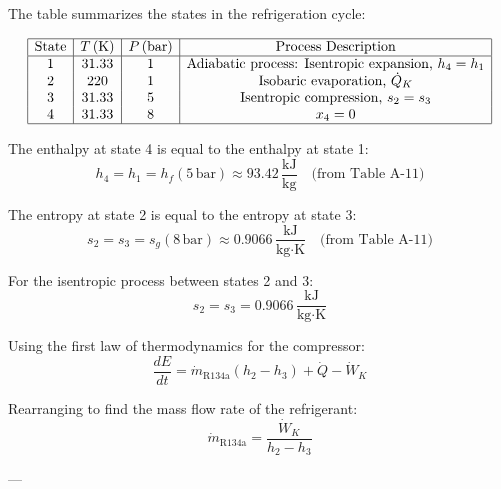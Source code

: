 The table summarizes the states in the refrigeration cycle:  

\[
\begin{array}{|c|c|c|c|}
\hline
\text{State} & T \, (\text{K}) & P \, (\text{bar}) & \text{Process Description} \\
\hline
1 & 31.33 & 1 & \text{Adiabatic process: Isentropic expansion, } h_4 = h_1 \\
2 & 220 & 1 & \text{Isobaric evaporation, } \dot{Q}_K \\
3 & 31.33 & 5 & \text{Isentropic compression, } s_2 = s_3 \\
4 & 31.33 & 8 & x_4 = 0 \\
\hline
\end{array}
\]

The enthalpy at state 4 is equal to the enthalpy at state 1:  
\[
h_4 = h_1 = h_f(5 \, \text{bar}) \approx 93.42 \, \frac{\text{kJ}}{\text{kg}} \quad \text{(from Table A-11)}  
\]

The entropy at state 2 is equal to the entropy at state 3:  
\[
s_2 = s_3 = s_g(8 \, \text{bar}) \approx 0.9066 \, \frac{\text{kJ}}{\text{kg·K}} \quad \text{(from Table A-11)}  
\]

For the isentropic process between states 2 and 3:  
\[
s_2 = s_3 = 0.9066 \, \frac{\text{kJ}}{\text{kg·K}}  
\]

Using the first law of thermodynamics for the compressor:  
\[
\frac{dE}{dt} = \dot{m}_{\text{R134a}} (h_2 - h_3) + \dot{Q} - \dot{W}_K  
\]

Rearranging to find the mass flow rate of the refrigerant:  
\[
\dot{m}_{\text{R134a}} = \frac{\dot{W}_K}{h_2 - h_3}  
\]

---